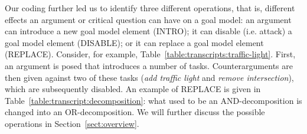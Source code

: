 Our coding further led us to identify three different operations, that is, different effects an argument or critical question can have on a goal model: an argument can introduce a new goal model element (\textsf{INTRO}); it can disable (i.e. attack) a goal model element (\textsf{DISABLE}); or it can replace a goal model element (\textsf{REPLACE}). Consider, for example, Table~\ref{table:transcripts:traffic-light}. First, an argument is posed that introduces a number of tasks. Counterarguments are then given against two of these tasks (\emph{add traffic light} and \emph{remove intersection}), which are subsequently disabled. An example of \textsf{REPLACE} is given in Table~\ref{table:transcript:decomposition}: what used to be an AND-decomposition is changed into an OR-decomposition. We will further discuss the possible operations in Section~\ref{sect:overview}.





